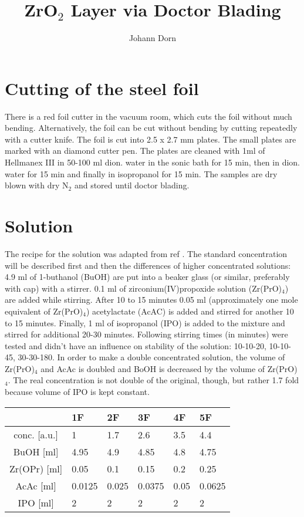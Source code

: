 \documentclass[a4paper]{article}
\title{ZrO$_2$ Layer via Doctor Blading }
\author{Johann Dorn}
\begin{document}
\maketitle
\iffalse
my notes
\fi
\justify

\section{Cutting of the steel foil}
There is a red foil cutter in the vacuum room, which cuts the foil without much bending.
Alternatively, the foil can be cut without bending by cutting repeatedly with a cutter knife.
The foil is cut into 2.5 x 2.7 mm plates.
The small plates are marked with an diamond cutter pen.
The plates are cleaned with 1ml of Hellmanex III in 50-100 ml dion. water in the sonic bath for 15 min, then in dion. water for 15 min and finally in isopropanol for 15 min. 
The samples are dry blown with dry N$_2$ and stored until doctor blading.

\section{Solution}
The recipe for the solution was adapted from ref \cite{Hu2016}.
The standard concentration will be described first and then the differences of higher concentrated solutions:
4.9 ml of 1-buthanol (BuOH) are put into a beaker glass (or similar, preferably with cap) with a stirrer. 
0.1 ml of zirconium(IV)propoxide solution (Zr(PrO)$_4$) are added while stirring.  
After 10 to 15 minutes 0.05 ml (approximately one mole equivalent of Zr(PrO)$_4$) acetylactate (AcAC) is added and stirred for another 10 to 15 minutes. 
Finally, 1 ml of isopropanol (IPO) is added to the mixture and stirred for additional 20-30 minutes. 
Following stirring times (in minutes) were tested and didn't have an influence on stability of the solution: 10-10-20, 10-10-45, 30-30-180. 
In order to make a double concentrated solution, the volume of Zr(PrO)$_4$ and AcAc is doubled and BoOH is decreased by the volume of Zr(PrO)$_4$. 
The real concentration is not double of the original, though, but rather 1.7 fold because volume of IPO is kept constant.

\begin{table}[h]
	\centering
	\begin{tabular}{clllll}
		\hline
				&1F		&2F		&3F		&4F		&5F		\\
		\hline
		conc. [a.u.]	&1		&1.7	&2.6	&3.5	&4.4	\\
		\hline
		BuOH [ml]		&4.95	&4.9	&4.85	&4.8	&4.75	\\
		Zr(OPr) [ml]	&0.05	&0.1	&0.15	&0.2	&0.25	\\
		AcAc [ml]		&0.0125	&0.025	&0.0375	&0.05	&0.0625	\\
		IPO [ml]		&2		&2		&2		&2		&2		\\
		\hline
	\end{tabular}
\end{table}
\end{document}
